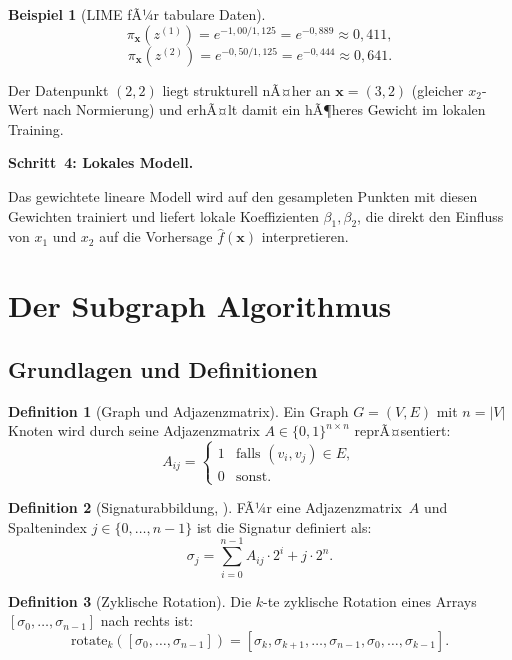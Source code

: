﻿\documentclass[a4paper,12pt]{article}
\theoremstyle{definition}
\newtheorem{definition}{Definition}[section]
\newtheorem{beispiel}{Beispiel}[section]
\begin{document}
\begin{beispiel}[LIME fÃ¼r tabulare Daten]
  \[
    \pi_\mathbf{x}(z^{(1)}) = e^{-1{,}00/1{,}125} = e^{-0{,}889} \approx 0{,}411,
  \]
  \[
    \pi_\mathbf{x}(z^{(2)}) = e^{-0{,}50/1{,}125} = e^{-0{,}444} \approx 0{,}641.
  \]

  Der Datenpunkt $(2, 2)$ liegt strukturell nÃ¤her an $\mathbf{x} = (3, 2)$ (gleicher
  $x_2$-Wert nach Normierung) und erhÃ¤lt damit ein hÃ¶heres Gewicht im lokalen Training.

  \textbf{Schritt~4: Lokales Modell.}

  Das gewichtete lineare Modell wird auf den gesampleten Punkten mit diesen Gewichten
  trainiert und liefert lokale Koeffizienten $\beta_1, \beta_2$, die direkt den Einfluss
  von $x_1$ und $x_2$ auf die Vorhersage $\hat{f}(\mathbf{x})$ interpretieren.
\end{beispiel}

\section{Der Subgraph Algorithmus}

\subsection{Grundlagen und Definitionen}

\begin{definition}[Graph und Adjazenzmatrix]
  Ein Graph $G = (V, E)$ mit $n = |V|$ Knoten wird durch seine Adjazenzmatrix
  $A \in \{0,1\}^{n \times n}$ reprÃ¤sentiert:
  \[
    A_{ij} = \begin{cases}
      1 & \text{falls } (v_i, v_j) \in E, \\
      0 & \text{sonst.}
    \end{cases}
  \]
\end{definition}

\begin{definition}[Signaturabbildung, \citealt{Epp2026}]
  FÃ¼r eine Adjazenzmatrix~$A$ und Spaltenindex $j \in \{0,\ldots,n-1\}$ ist die
  Signatur definiert als:
  \begin{equation}
    \sigma_j = \sum_{i=0}^{n-1} A_{ij} \cdot 2^i + j \cdot 2^n.
    \label{eq:signature}
  \end{equation}
\end{definition}

\begin{definition}[Zyklische Rotation]
  Die $k$-te zyklische Rotation eines Arrays $[\sigma_0, \ldots, \sigma_{n-1}]$
  nach rechts ist:
  \[
    \mathrm{rotate}_k([\sigma_0,\ldots,\sigma_{n-1}])
    = [\sigma_k, \sigma_{k+1}, \ldots, \sigma_{n-1}, \sigma_0, \ldots, \sigma_{k-1}].
  \]
\end{definition}
\end{document}
